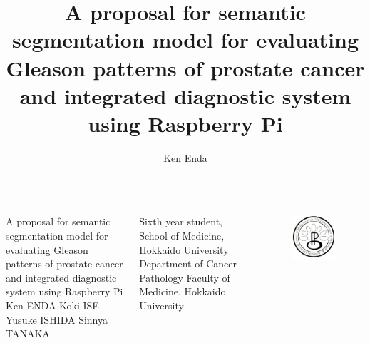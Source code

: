 \documentclass[
17pt,
  dvipdfmx,
  xcolor={svgnames},
  hyperref={colorlinks,citecolor=DeepPink4,linkcolor=DarkRed,urlcolor=DarkBlue}
  ]{beamer}
\title{A proposal for semantic segmentation model for evaluating Gleason patterns of prostate cancer and integrated diagnostic system using Raspberry Pi}
\author{Ken Enda}
\institute{Department of Cancer Pathology Faculty of Medicine, HOKKAIDO UNIVERSITY}
\begin{document}
\nocite{*}

\begin{columns}[T]
  \begin{minipage}[]{0.75\columnwidth}
    \vspace{5mm}
    \huge A proposal for semantic segmentation model for evaluating Gleason patterns of prostate cancer and integrated diagnostic system using Raspberry Pi
    \\[5mm]
    \large Ken ENDA \cite{student} \hspace{5mm} Koki ISE\cite{student} \hspace{5mm} Yusuke ISHIDA\cite{teacher} \hspace{5mm} Sinnya TANAKA\cite{teacher}
    {\small
      \begin{thebibliography}{99}
        \beamertemplatetextbibitems
        \setlength{\itemsep}{-.5zw}
         Sixth year student, School of Medicine, Hokkaido University
         Department of Cancer Pathology Faculty of Medicine, Hokkaido University
      \end{thebibliography}
    }

  \end{minipage}

  \begin{minipage}[]{0.08\columnwidth}
    \begin{figure}\centering
      \includegraphics[width=\columnwidth]{assets/logo_patho2.png}
    \end{figure}
  \end{minipage}


\end{columns}
\end{document}
